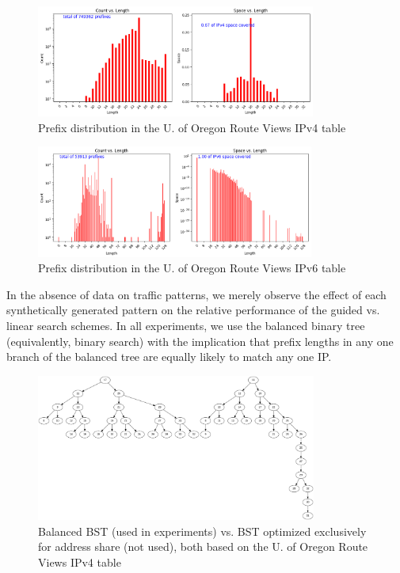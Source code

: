 \documentclass[conference,compsoc]{IEEEtran}
\begin{document}
\begin{figure}[h]
\centering
\includegraphics[height=1.45in]{../img/prefix_distribution_v4.png}
  \caption{Prefix distribution in the U. of Oregon Route Views IPv4 table}
\label{fig:prefixes-v4}
\end{figure}

\begin{figure}[h]
\centering
\includegraphics[height=1.45in]{../img/prefix_distribution_v6.png}
  \caption{Prefix distribution in the U. of Oregon Route Views IPv6 table}
\label{fig:prefixes-v6}
\end{figure}

In the absence of data on traffic patterns, we merely observe the effect 
of each synthetically generated pattern on the relative performance of the 
guided vs. linear search schemes. In all
experiments, we use the balanced binary tree (equivalently, binary search)
with the implication that prefix lengths in any one branch of the
balanced tree are equally likely to match any one IP.

\begin{figure}[h]
\centering
\includegraphics[height=1.9in]{../img/trees_v4.png}
  \caption{Balanced BST (used in experiments) vs. BST optimized exclusively for address share (not used), both based on the U. of Oregon Route Views IPv4 table}
\label{fig:trees-v4}
\end{figure}
\end{document}
